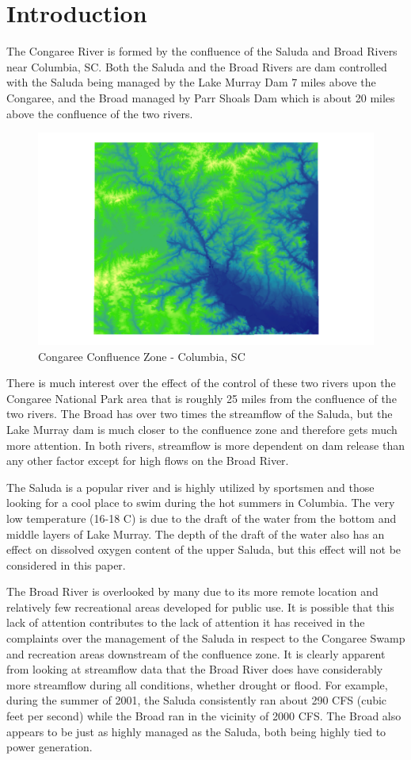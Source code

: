 \documentclass[12pt]{report}
\begin{document}
\chapter{Introduction}
 The Congaree River is
formed by the confluence of the Saluda and Broad Rivers near
Columbia, SC.  Both the Saluda and the Broad Rivers are dam
controlled with the Saluda being managed by the Lake Murray Dam 7
miles above the Congaree, and the Broad managed by Parr Shoals Dam
which is about 20 miles above the confluence of the two rivers.
\begin{figure}[h]
\centering\includegraphics[width=\linewidth]{all.pdf}
\caption{Congaree Confluence Zone - Columbia, SC} \label{fig:ccf}
\end{figure}
There is much interest over the effect of the control of these two
rivers upon the Congaree National Park area that is roughly 25
miles from the confluence of the two rivers.  The Broad has over
two times the streamflow of the Saluda, but the Lake Murray dam is
much closer to the confluence zone and therefore gets much more
attention.   In both rivers, streamflow is more dependent on dam
release than any other factor except for high flows on the Broad
River.

The Saluda is a popular river and is highly utilized by sportsmen
and those looking for a cool place to swim during the hot summers
in Columbia.  The very low temperature (16-18 C) is due to the
draft of the water from the bottom and middle layers of Lake
Murray.  The depth of the draft of the water also has an effect on
dissolved oxygen content of the upper Saluda, but this effect will
not be considered in this paper.

The Broad River is overlooked by many due to its more remote
location and relatively few recreational areas developed for
public use.  It is possible that this lack of attention
contributes to the lack of attention it has received in the
complaints over the management of the Saluda in respect to the
Congaree Swamp and recreation areas downstream of the confluence
zone.  It is clearly apparent from looking at streamflow data that
the Broad River does have considerably more streamflow during all
conditions, whether drought or flood.  For example, during the
summer of 2001, the Saluda consistently ran about 290 CFS (cubic
feet per second) while the Broad ran in the vicinity of 2000 CFS.
The Broad also appears to be just as highly managed as the Saluda,
both being highly tied to power generation.
\end{document}
